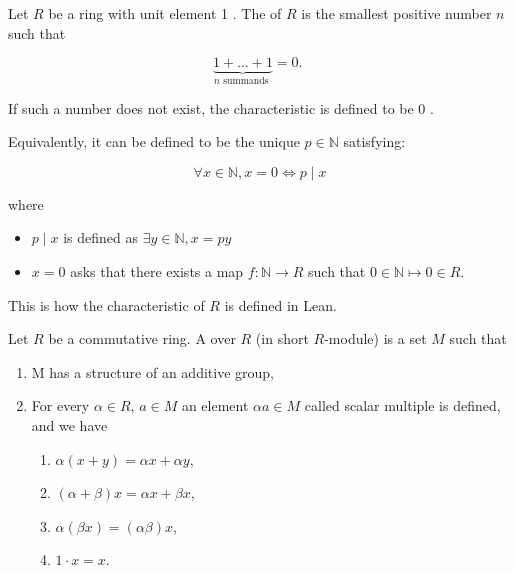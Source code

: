 \begin{definition}[Characteristic]
    \label{characteristic}
    \leanok

    Let $R$ be a ring with unit element 1 . The  of $R$ is the smallest positive number $n$ such that

    $$
    \underbrace{1+\ldots+1}_{n \text { summands }}=0 \text {. }
    $$
    
    If such a number does not exist, the characteristic is defined to be 0 .

\end{definition}

\begin{remark}
    \label{mk:characteristic}

    Equivalently, it can be defined to be the unique $p \in \mathbb{N}$ satisfying:

    $$
    \forall x \in \mathbb{N}, x = 0 \iff p \mid x
    $$

    where
    
    \begin{itemize}

        \item $p \mid x$ is defined as $\exists y \in \mathbb{N}, x = p y$
    
        \item $x = 0$ asks that there exists a map $f : \mathbb{N} \to R$ such that $0 \in \mathbb{N} ↦ 0 \in R$.
        
    \end{itemize}

    This is how the characteristic of $R$ is defined in Lean.

\end{remark}

\begin{definition}[Module]
    \label{module}
    \leanok

    Let $R$ be a commutative ring. A  over $R$ (in short $R$-module) is a set $M$ such that

    \begin{enumerate}
      \item M has a structure of an additive group,
    
      \item For every $\alpha \in R$, $a \in M$ an element $\alpha a \in M$ called scalar multiple is defined, and we have
      
        \begin{enumerate}[i]
            \item $\alpha(x+y)=\alpha x+\alpha y$,
            \item $(\alpha+\beta) x=\alpha x+\beta x$,
            \item $\alpha(\beta x)=(\alpha \beta) x$,
            \item $1 \cdot x=x$.
        \end{enumerate}
    \end{enumerate}

\end{definition}


